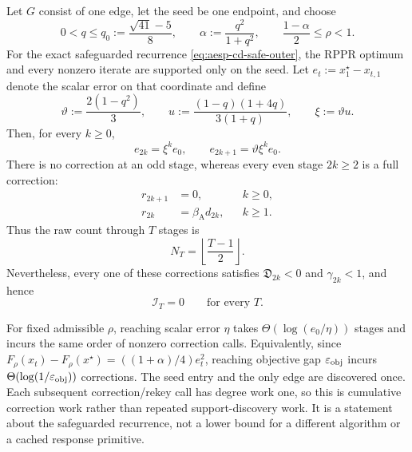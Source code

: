 \begin{proposition}
\label{prop:aesp-cd-singleton-corrections}
Let $G$ consist of one edge, let the seed be one endpoint, and choose
\begin{equation}
 0<q\leq q_0:=\frac{\sqrt{41}-5}{8},
 \qquad
 \alpha:=\frac{q^2}{1+q^2},
 \qquad
 \frac{1-\alpha}{2}\leq\rho<1.
 \label{eq:aesp-cd-singleton-parameters}
\end{equation}
For the exact safeguarded recurrence
\cref{eq:aesp-cd-safe-outer}, the RPPR optimum and every nonzero iterate are
supported only on the seed.  Let $e_t:=x_1^\star-x_{t,1}$ denote the scalar
error on that coordinate and define
\begin{equation}
 \vartheta:=\frac{2(1-q^2)}{3},
 \qquad
 u:=\frac{(1-q)(1+4q)}{3(1+q)},
 \qquad
 \xi:=\vartheta u.
 \label{eq:aesp-cd-singleton-ratios}
\end{equation}
Then, for every $k\geq0$,
\begin{equation}
 e_{2k}=\xi^ke_0,
 \qquad
 e_{2k+1}=\vartheta\xi^ke_0.
 \label{eq:aesp-cd-singleton-errors}
\end{equation}
There is no correction at an odd stage, whereas every even stage $2k\geq2$
is a full correction:
\begin{equation}
 \begin{aligned}
 r_{2k+1}&=0,&&k\geq0,\\
 r_{2k}&=\beta_{\mathrm A}d_{2k},&&k\geq1.
 \end{aligned}
 \label{eq:aesp-cd-singleton-schedule}
\end{equation}
Thus the raw count through $T$ stages is
\begin{equation}
 N_T=\left\lfloor\frac{T-1}{2}\right\rfloor.
 \label{eq:aesp-cd-singleton-count}
\end{equation}
Nevertheless, every one of these corrections satisfies
$\mathfrak D_{2k}<0$ and $\gamma_{2k}<1$, and hence
\begin{equation}
 \mathcal I_T=0
 \qquad\text{for every }T.
 \label{eq:aesp-cd-singleton-zero-inflation}
\end{equation}

For fixed admissible $\rho$, reaching scalar error $\eta$ takes
$\Theta(\log(e_0/\eta))$ stages and incurs the same order of nonzero
correction calls.  Equivalently, since
$F_\rho(x_t)-F_\rho(x^\star)=((1+\alpha)/4)e_t^2$, reaching objective gap
$\varepsilon_{\mathrm{obj}}$ incurs $\Theta(\log(1/\varepsilon_{\mathrm{obj}}))$ corrections.  The seed entry and
the only edge are discovered once.  Each subsequent correction/rekey call
has degree work one, so this is cumulative correction work rather than
repeated support-discovery work.  It is a statement about the safeguarded
recurrence, not a lower bound for a different algorithm or a cached response
primitive.
\end{proposition}

